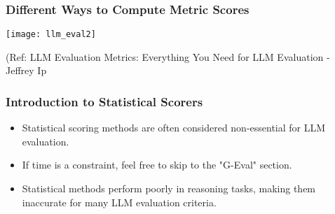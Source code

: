 \begin{frame}[fragile]\frametitle{Different Ways to Compute Metric Scores}


\begin{center}
\texttt{[image: llm\_eval2]}
\end{center}		
		
{\tiny (Ref: LLM Evaluation Metrics: Everything You Need for LLM Evaluation - Jeffrey Ip}
			
			
\end{frame}


\begin{frame}[fragile]\frametitle{Introduction to Statistical Scorers}
  \begin{itemize}
    \item Statistical scoring methods are often considered non-essential for LLM evaluation.
    \item If time is a constraint, feel free to skip to the "G-Eval" section.
    \item Statistical methods perform poorly in reasoning tasks, making them inaccurate for many LLM evaluation criteria.
  \end{itemize}
\end{frame}

